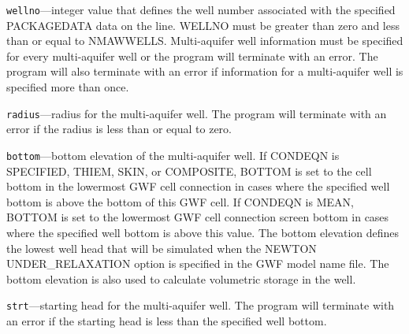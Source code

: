 \begin{description}
\item \texttt{wellno}---integer value that defines the well number associated with the specified PACKAGEDATA data on the line. WELLNO must be greater than zero and less than or equal to NMAWWELLS. Multi-aquifer well information must be specified for every multi-aquifer well or the program will terminate with an error.  The program will also terminate with an error if information for a multi-aquifer well is specified more than once.

\item \texttt{radius}---radius for the multi-aquifer well. The program will terminate with an error if the radius is less than or equal to zero.

\item \texttt{bottom}---bottom elevation of the multi-aquifer well. If CONDEQN is SPECIFIED, THIEM, SKIN, or COMPOSITE, BOTTOM is set to the cell bottom in the lowermost GWF cell connection in cases where the specified well bottom is above the bottom of this GWF cell. If CONDEQN is MEAN, BOTTOM is set to the lowermost GWF cell connection screen bottom in cases where the specified well bottom is above this value. The bottom elevation defines the lowest well head that will be simulated when the NEWTON UNDER\_RELAXATION option is specified in the GWF model name file. The bottom elevation is also used to calculate volumetric storage in the well.

\item \texttt{strt}---starting head for the multi-aquifer well. The program will terminate with an error if the starting head is less than the specified well bottom.


\end{description}
